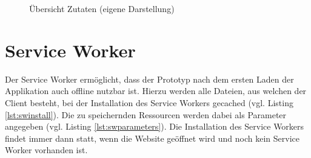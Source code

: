 \documentclass[a4paper, 12pt]{scrreprt}
\begin{document}
\begin{figure}[H]
\begin{minipage}{.45\textwidth}
		\caption[Übersicht Zutaten]{Übersicht Zutaten (eigene Darstellung)}
		\label{fig:uiIngredientsSmall}
	\end{minipage}
\end{figure}

\section{Service Worker}

Der Service Worker ermöglicht, dass der Prototyp nach dem ersten Laden der Applikation auch offline nutzbar ist. Hierzu werden alle Dateien, aus welchen der Client besteht, bei der Installation des Service Workers gecached (vgl. Listing \ref{lst:swinstall}). Die zu speichernden Ressourcen werden dabei als Parameter angegeben (vgl. Listing \ref{lst:swparameters}). Die Installation des Service Workers findet immer dann statt, wenn die Website geöffnet wird und noch kein Service Worker vorhanden ist.
\end{document}

